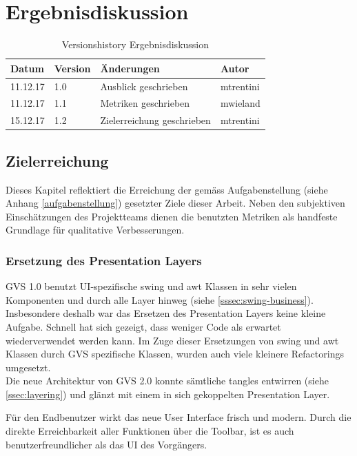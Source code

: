 \documentclass[11pt,a4paper,english,oneside]{book}
\numberwithin{equation}{chapter}
\begin{document}
	

	\chapter{Ergebnisdiskussion} \label{ch:ergebnisse}
	\begin{table}[h!]
		\centering
		\begin{tabularx}{\linewidth}{l l X l}
			\toprule 
			Datum & Version & Änderungen & Autor \\
			\midrule
			11.12.17 & 1.0 & Ausblick geschrieben & mtrentini \\
			11.12.17 & 1.1 & Metriken geschrieben & mwieland \\
			15.12.17 & 1.2 & Zielerreichung geschrieben & mtrentini \\
			\bottomrule 
		\end{tabularx} 
		\caption{Versionshistory Ergebnisdiskussion} 
	\end{table}	
	
	
	
	\section{Zielerreichung}
	Dieses Kapitel reflektiert die Erreichung der gemäss Aufgabenstellung (siehe Anhang \ref{aufgabenstellung}) gesetzter Ziele dieser Arbeit. Neben den subjektiven Einschätzungen des Projektteams dienen die benutzten Metriken als handfeste Grundlage für qualitative Verbesserungen.
	
	\subsection{Ersetzung des Presentation Layers}
	GVS 1.0 benutzt UI-spezifische \gls{swing} und \gls{awt} Klassen in sehr vielen Komponenten und durch alle Layer hinweg (siehe \ref{sssec:swing-business}). Insbesondere deshalb war das Ersetzen des Presentation Layers keine kleine Aufgabe. Schnell hat sich gezeigt, dass weniger Code als erwartet wiederverwendet werden kann. Im Zuge dieser Ersetzungen von \gls{swing} und \gls{awt} Klassen durch GVS spezifische Klassen, wurden auch viele kleinere Refactorings umgesetzt.\\
	Die neue Architektur von GVS 2.0 konnte sämtliche \gls{tangle}s entwirren (siehe \ref{ssec:layering}) und glänzt mit einem in sich gekoppelten Presentation Layer.
	
	Für den Endbenutzer wirkt das neue User Interface frisch und modern. Durch die direkte Erreichbarkeit aller Funktionen über die Toolbar, ist es auch benutzerfreundlicher als das UI des Vorgängers.
	
\end{document}
